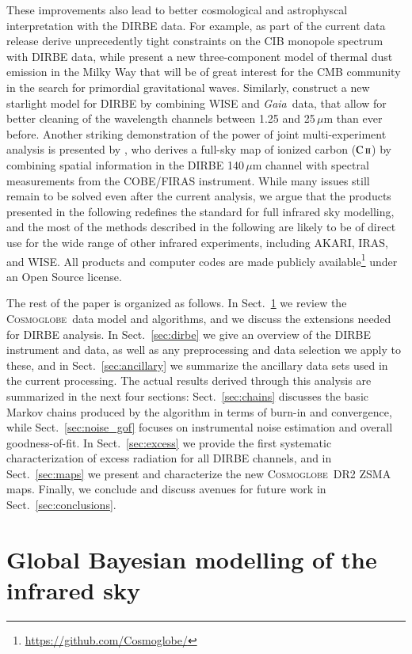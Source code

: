 \documentclass{aa}
\def\GAIA{\textit{Gaia}}
\newcommand{\CII}{\ensuremath{\textsc{C\,ii}}}
\newcommand{\cosmoglobe}{\textsc{Cosmoglobe}}
\begin{document}
These improvements also lead to better cosmological and astrophyscal interpretation with the DIRBE data. For example, as part of the current data release \citet{CG02_03} derive unprecedently tight constraints on the CIB monopole spectrum with DIRBE data, while \citet{CG02_05} present a new three-component model of thermal dust emission in the Milky Way that will be of great interest for the CMB community in the search for primordial gravitational waves. Similarly, \citet{CG02_04} construct a new starlight model for DIRBE by combining WISE and \GAIA\ data, that allow for better cleaning of the wavelength channels between 1.25 and 25$\,\mu$m than ever before. Another striking demonstration of the power of joint multi-experiment analysis is presented by \citet{CG02_06}, who derives a full-sky map of ionized carbon (\CII) by combining spatial information in the DIRBE 140\,$\mu$m channel with spectral measurements from the COBE/FIRAS instrument. While many issues still remain to be solved even after the current analysis, we argue that the products presented in the following redefines the standard for full infrared sky modelling, and the most of the methods described in the following are likely to be of direct use for the wide range of other infrared experiments, including AKARI, IRAS, and WISE. All products and computer codes are made publicly available\footnote{\url{https://github.com/Cosmoglobe/}} under an Open Source license.

The rest of the paper is organized as follows. In Sect.~\ref{sec:global_modelling} we review the \cosmoglobe\ data model and algorithms, and we discuss the extensions needed for DIRBE analysis. In Sect.~\ref{sec:dirbe} we give an overview of the DIRBE instrument and data, as well as any preprocessing and data selection we apply to these, and in Sect.~\ref{sec:ancillary} we summarize the ancillary data sets used in the current processing. The actual results derived through this analysis are summarized in the next four sections: Sect.~\ref{sec:chains} discusses the basic Markov chains produced by the algorithm in terms of burn-in and convergence, while Sect.~\ref{sec:noise_gof} focuses on instrumental noise estimation and overall goodness-of-fit. In Sect.~\ref{sec:excess} we provide the first systematic characterization of excess radiation for all DIRBE channels, and in Sect.~\ref{sec:maps} we present and characterize the new \cosmoglobe\ DR2 ZSMA maps. Finally, we conclude and discuss avenues for future work in Sect.~\ref{sec:conclusions}. 

\section{Global Bayesian modelling of the infrared sky}
\label{sec:global_modelling}
\end{document}
